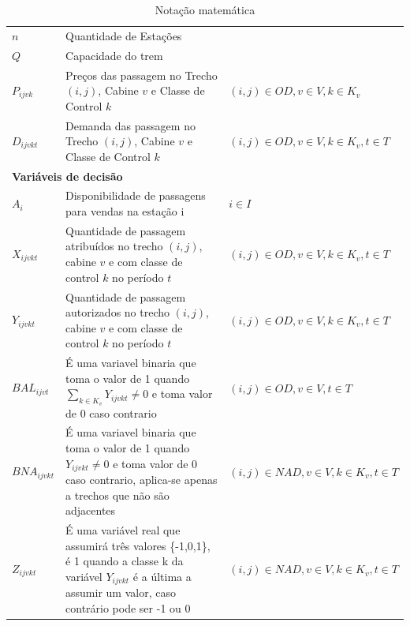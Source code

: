\begin{table}[h]
\begin{tabular}{p{2cm} p{9.5cm} p{3.2cm}}
		$n$                & Quantidade de Estações                                                                                                                                                 &                                              \\
		$Q$                & Capacidade do trem                                                                                                                                                     &                                              \\
		$P_{ijvk}$         & Preços  das passagem no Trecho $(i,j)$, Cabine $v$ e Classe de Control $k$                                                                                             & $(i,j) \in OD,v \in V, k \in K_v$            \\
		$D_{ijvkt}$        & Demanda  das passagem no Trecho $(i,j)$, Cabine $v$ e Classe de Control $k$                                                                                            & $(i,j) \in OD,v \in V, k \in K_v, t \in T$   \\ \midrule
		\multicolumn{3}{l}{\textbf{Variáveis de decisão}}                                                                                                                                                                                          \\ \midrule
		$A_{i}$            & Disponibilidade de passagens para vendas na estação i                                                                                                                  & $i \in I$                                    \\
		$X_{ijvkt}$        & Quantidade de passagem atribuídos no trecho $(i,j)$, cabine $v$ e com classe de control $k$ no período $t$                                                             & $(i,j) \in OD, v \in V, k \in K_v, t \in T$  \\
		$Y_{ijvkt}$        & Quantidade de passagem autorizados no trecho $(i,j)$, cabine $v$ e com classe de control $k$ no período $t$                                                            & $(i,j) \in OD, v \in V, k \in K_v, t \in T$  \\
		$BAL_{ijvt}$       & É uma variavel binaria que toma o valor de 1 quando $\sum_{k \in K_v }Y_{ijvkt} \neq 0$ e toma  valor de 0 caso contrario                                              & $(i,j) \in OD, v \in V, t \in T$             \\
		$BNA_{ijvkt}$      & É uma variavel binaria que toma o valor de 1 quando $Y_{ijvkt} \neq 0$ e toma  valor de 0 caso contrario, aplica-se apenas a trechos que não são adjacentes            & $(i,j) \in NAD, v \in V, k \in K_v, t \in T$ \\
		$Z_{ijvkt}$        & É uma variável real que assumirá três valores \{-1,0,1\}, é 1 quando a classe k da variável $Y_{ijvkt}$ é a última a assumir um valor, caso contrário pode ser -1 ou 0 & $(i,j) \in NAD, v \in V, k \in K_v, t \in T$ \\
		\bottomrule
	\end{tabular}
	\caption{Notação matemática}
	\label{tab: m1_definicao}
\end{table}

